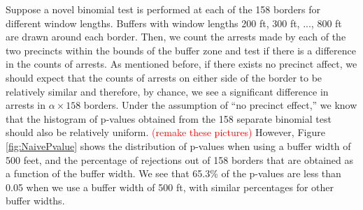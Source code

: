 \documentclass[a4paper,11pt]{article}
\begin{document}
Suppose a novel binomial test is performed at each of the 158 borders for different window lengths. Buffers with window lengths 200 ft, 300 ft, ..., 800 ft are drawn around each border. Then, we count the arrests made by each of the two precincts within the bounds of the buffer zone and test if there is a difference in the counts of arrests. As mentioned before, if there exists no precinct affect, we should expect that the counts of arrests on either side of the border to be relatively similar and therefore, by chance, we see a significant difference in arrests in $\alpha \times 158$ borders. Under the assumption of ``no precinct effect,'' we know that the histogram of p-values obtained from the 158 separate binomial test should also be relatively uniform. \textcolor{red}{(remake these pictures)} However, Figure \ref{fig:NaivePvalue} shows the distribution of p-values when using a buffer width of 500 feet, and the percentage of rejections out of 158 borders that are obtained as a function of the buffer width. We see that 65.3\% of the p-values are less than 0.05 when we use a buffer width of 500 ft, with similar percentages for other buffer widths.
\end{document}
